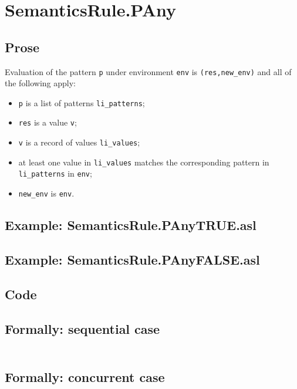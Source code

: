 \documentclass{book}
\begin{document}
\section{SemanticsRule.PAny \label{sec:SemanticsRule.PAny}}

    \subsection{Prose}
  Evaluation of the pattern \texttt{p} under environment \texttt{env} is
  \texttt{(res,new\_env)} and all of the following apply:
    \begin{itemize}
    \item \texttt{p} is a list of patterns \texttt{li\_patterns};
    \item \texttt{res} is a value \texttt{v};
    \item \texttt{v} is a record of values \texttt{li\_values};
    \item at least one value in \texttt{li\_values} matches the corresponding
pattern in \texttt{li\_patterns} in \texttt{env};
    \item \texttt{new\_env} is \texttt{env}.
    \end{itemize}

    \subsection{Example: SemanticsRule.PAnyTRUE.asl}

    \subsection{Example: SemanticsRule.PAnyFALSE.asl}

    \subsection{Code}

    \subsection{Formally: sequential case}
    \begin{align}
    \end{align} 

    \subsection{Formally: concurrent case}
    \begin{align}
    \end{align} 
\end{document}
